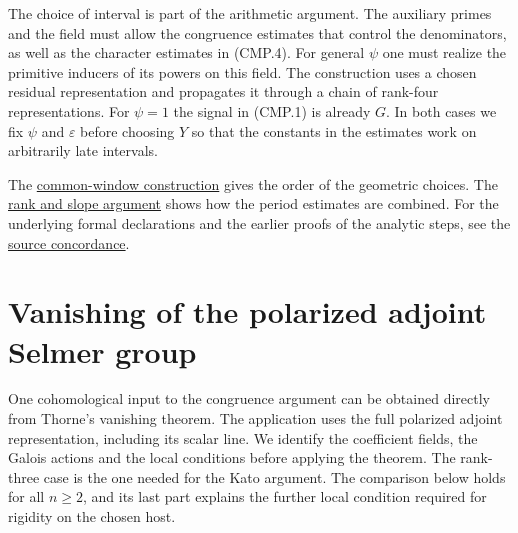 The choice of interval is part of the arithmetic argument. The auxiliary
primes and the field must allow the congruence estimates that control
the denominators, as well as the character estimates in (CMP.4). For
general $\psi$ one must realize the primitive inducers of its powers
on this field. The construction uses a chosen residual representation
and propagates it through a chain of rank-four representations. For
$\psi=1$ the signal in (CMP.1) is already $G$. In both cases we fix
$\psi$ and $\varepsilon$ before choosing $Y$ so that the constants in
the estimates work on arbitrarily late intervals.

The \hyperref[ms-manuscript-notes-arithmetic-common-design-window-transfer-md]{common-window
construction} gives the order of the geometric choices. The
\hyperref[ms-manuscript-notes-theta-centered-period-rank-and-slope-md]{rank and slope argument}
shows how the period estimates are combined. For the underlying formal
declarations and the earlier proofs of the analytic steps, see the
\href{https://github.com/bmatschke/grh-alpoge-claude/blob/edition-5/research/modules/construction/conditional_main_v42/contracts.json}{source concordance}.

\section{Vanishing of the polarized adjoint Selmer group}
\label{sec:adk-match}

One cohomological input to the congruence argument can be obtained
directly from Thorne's vanishing theorem. The application uses the
full polarized adjoint representation, including its scalar line. We
identify the coefficient fields, the Galois actions and the local
conditions before applying the theorem. The rank-three case is the one
needed for the Kato argument. The comparison below holds for all
$n\geq2$, and its last part explains the further local condition
required for rigidity on the chosen host.

